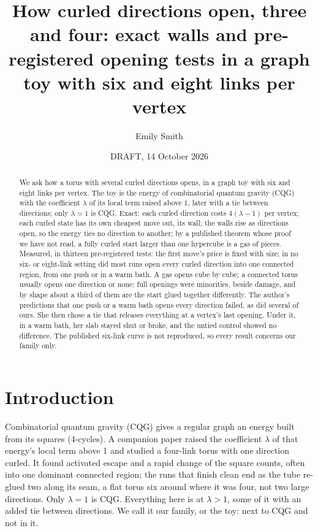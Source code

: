 \documentclass[aps,pre,10pt,twocolumn,superscriptaddress,nofootinbib]{revtex4-2}
\begin{document}
\title{How curled directions open, three and four: exact walls and pre-registered opening tests in a graph toy
with six and eight links per vertex}

\author{Emily Smith}

\date{DRAFT, 14 October 2026}

\begin{abstract}
We ask how a torus with several curled directions opens, in a graph toy with six and eight links per vertex. The toy
is the energy of combinatorial quantum gravity (CQG) with the coefficient $\lambda$ of its local term raised above
1, later with a tie between directions; only $\lambda = 1$ is CQG. Exact: each curled direction costs
$4(\lambda - 1)$ per vertex; each curled state has its own cheapest move out, its wall; the walls rise as directions
open, so the energy ties no direction to another; by a published theorem whose proof we have not read, a fully
curled start larger than one hypercube is a gas of pieces. Measured, in thirteen pre-registered tests: the first
move's price is fixed with size; in no six- or eight-link setting did most runs open every curled direction into one
connected region, from one push or in a warm bath. A gas opens cube by cube; a connected torus usually opens one
direction or none; full openings were minorities, beside damage, and by shape about a third of them are the start
glued together differently. The author's predictions that one push or a warm bath opens every direction failed, as
did several of ours. She then chose a tie that releases everything at a vertex's last opening. Under it, in a warm
bath, her slab stayed shut or broke, and the untied control showed no difference. The published six-link curve is
not reproduced, so every result concerns our family only.
\end{abstract}

\maketitle

\section{Introduction}

Combinatorial quantum gravity (CQG) \cite{KTB19,T25} gives a regular graph an energy built from its squares
(4-cycles). A companion paper \cite{paper1} raised the coefficient $\lambda$ of that energy's local term above 1 and
studied a four-link torus with one direction curled. It found activated escape and a rapid change of the square
counts, often into one dominant connected region; the runs that finish clean end as the tube re-glued two along its
seam, a flat torus six around where it was four, not two large directions. Only $\lambda = 1$ is CQG. Everything here is at $\lambda > 1$, some of
it with an added tie between directions. We call it our family, or the toy: next to CQG and not in it.
\end{document}
